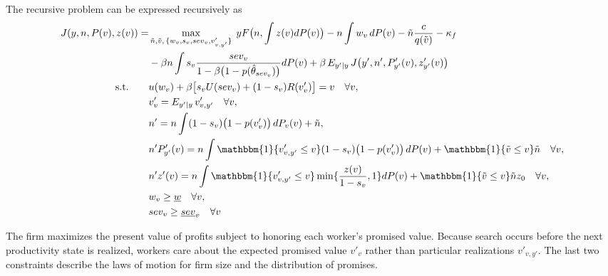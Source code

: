 \begin{lemma}\label{firmproblem:orig}
The recursive problem can be expressed recursively as
\begin{equation*}
\begin{split}
J(y,n,P(v),z(v))= & \max_{\tilde{n},\tilde{v},\,\{w_v,s_v,sev_v,v'_{v,y'}\}} \; yF\big(n,\int z(v)dP(v)\big) - n\int w_v\,dP(v) - \tilde{n}\frac{c}{q(\tilde{v})} - \kappa_f \\
&- \beta n\int s_v \frac{sev_v}{1-\beta\big(1-p(\hat{\theta}_{sev_v})\big)}dP(v) + \beta\,E_{y'\mid y}\,J\big(y',n',P'_{y'}(v),z'_{y'}(v)\big) \\
\text{s.t.}\qquad & u(w_v)+\beta\big[s_v U(sev_v)+(1-s_v)R(v'_v)\big]=v \quad \forall v, \\
& v'_v=E_{y'\mid y}\,v'_{v,y'} \quad \forall v, \\
& n'=n\int (1-s_v)\big(1-p(v'_v)\big)\,dP_v(v)+\tilde{n}, \\
& n'P'_{y'}(v)=n\int \mathbbm{1}\{v'_{v,y'}\le v\} (1-s_v)\big(1-p(v'_v)\big)\,dP(v)+\mathbbm{1}\{\tilde{v}\le v\}\tilde{n}  \quad \forall v, \\
& n' z'(v) = n\int \mathbbm{1}\{v'_{v,y'}\le v\} \min\{\frac{z(v)}{1-s_v},1\}dP(v) + \mathbbm{1}\{\tilde{v}\le v\}\tilde{n} z_0  \quad \forall v, \\
& w_v \geq \underline{w} \quad \forall v,\\
& sev_v \geq \underline{sev}_v \quad \forall v
\end{split}
\end{equation*}

\end{lemma}
The firm maximizes the present value of profits subject to honoring each worker’s promised value. Because search occurs before the next productivity state is realized, workers care about the expected promised value $v'_v$ rather than particular realizations $v'_{v,y'}$. The last two constraints describe the laws of motion for firm size and the distribution of promises.

